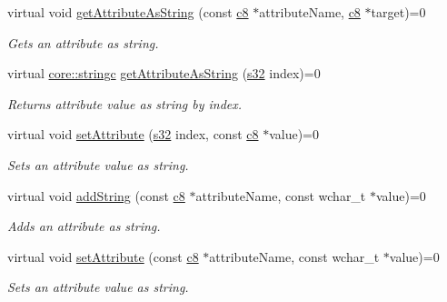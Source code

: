 \begin{DoxyCompactItemize}
virtual void \hyperlink{classirr_1_1io_1_1IAttributes_a8d10d4874bcb90143ba11f6c548cff42}{get\+Attribute\+As\+String} (const \hyperlink{namespaceirr_a9395eaea339bcb546b319e9c96bf7410}{c8} $\ast$attribute\+Name, \hyperlink{namespaceirr_a9395eaea339bcb546b319e9c96bf7410}{c8} $\ast$target)=0
\begin{DoxyCompactList}\small\item\em Gets an attribute as string. \end{DoxyCompactList}\item 
virtual \hyperlink{namespaceirr_1_1core_ab26a0e0359206b5a694f35c37c829d7f}{core\+::stringc} \hyperlink{classirr_1_1io_1_1IAttributes_a9938e13ea4cc3e8e0ea3fadacaa97c5c}{get\+Attribute\+As\+String} (\hyperlink{namespaceirr_ac66849b7a6ed16e30ebede579f9b47c6}{s32} index)=0
\begin{DoxyCompactList}\small\item\em Returns attribute value as string by index. \end{DoxyCompactList}\item 
virtual void \hyperlink{classirr_1_1io_1_1IAttributes_a0d270e61c06e6553857f90946fe177f7}{set\+Attribute} (\hyperlink{namespaceirr_ac66849b7a6ed16e30ebede579f9b47c6}{s32} index, const \hyperlink{namespaceirr_a9395eaea339bcb546b319e9c96bf7410}{c8} $\ast$value)=0
\begin{DoxyCompactList}\small\item\em Sets an attribute value as string. \end{DoxyCompactList}\item 
\mbox{\label{classirr_1_1io_1_1IAttributes_a71cc4c6d4368b85a0567a50526eef9a3}} 
virtual void \hyperlink{classirr_1_1io_1_1IAttributes_a71cc4c6d4368b85a0567a50526eef9a3}{add\+String} (const \hyperlink{namespaceirr_a9395eaea339bcb546b319e9c96bf7410}{c8} $\ast$attribute\+Name, const wchar\+\_\+t $\ast$value)=0
\begin{DoxyCompactList}\small\item\em Adds an attribute as string. \end{DoxyCompactList}\item 
virtual void \hyperlink{classirr_1_1io_1_1IAttributes_a61d592097529c763c1da1db8ef5af224}{set\+Attribute} (const \hyperlink{namespaceirr_a9395eaea339bcb546b319e9c96bf7410}{c8} $\ast$attribute\+Name, const wchar\+\_\+t $\ast$value)=0
\begin{DoxyCompactList}\small\item\em Sets an attribute value as string. \end{DoxyCompactList}\item 

\end{DoxyCompactItemize}
